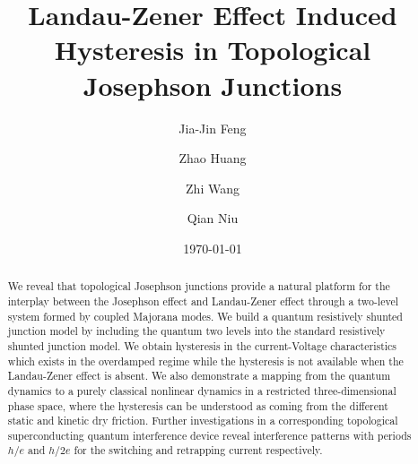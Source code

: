\documentclass[aps,prl,twocolumn,showpacs,showpacs,10pt,superscriptaddress]{revtex4-1}
\begin{document}
\title{Landau-Zener Effect Induced Hysteresis in Topological Josephson Junctions}


\author{Jia-Jin Feng}

\author{Zhao Huang}

\author{Zhi Wang}

\author{Qian Niu}


\begin{abstract}
We reveal that topological Josephson junctions provide a natural platform for the interplay between the Josephson effect and Landau-Zener effect through a two-level system formed by coupled Majorana modes. We build a quantum resistively shunted junction model by including the quantum two levels into the standard resistively shunted junction model. We obtain hysteresis in the current-Voltage characteristics which exists in the overdamped regime while the hysteresis is not available when the Landau-Zener effect is absent. We also demonstrate a mapping from the quantum dynamics to a purely classical nonlinear dynamics in a restricted three-dimensional phase space, where the hysteresis can be understood as coming from the different static and kinetic dry friction. Further investigations in a corresponding topological superconducting quantum interference device reveal interference patterns with periods $h/e$ and $h/2e$ for the switching and retrapping current respectively.
\end{abstract}
\date{\today}
\maketitle

\end{document}
